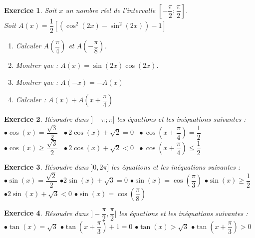 \documentclass[12pt,a4paper]{article}
\newcommand{\s}{\sin}
\newcommand{\cs}{\cos}
\theoremstyle{mystyle}
\newtheorem{exo}{Exercice}
\begin{document}
\begin{multicols*}{2}
\begin{exo}
Soit $x$ un nombre réel de l'intervalle $\left[-\dfrac{\pi}{2};\dfrac{\pi}{2}\right]$.\\
Soit $A(x) = \dfrac{1}{2}\left[(\cs^2(2x) - \s^2(2x)) - 1\right]$
\begin{enumerate}
	\item Calculer $A\left(\dfrac{\pi}{4}\right)$ et $A\left(-\dfrac{\pi}{8}\right)$.
	\item Montrer que : $A(x) = \s(2x)\cs(2x)$.
	\item Montrer que : $A(-x) = -A(x)$
	\item Calculer : $A(x) + A\left(x + \dfrac{\pi}{4}\right)$
\end{enumerate}
\end{exo}

\begin{exo}
Résoudre dans $]-\pi;\pi]$ les équations et les inéquations suivantes :\\
$\bullet \cs(x) = \dfrac{\sqrt{3}}{2} \ \ \ \bullet 2\cs(x) + \sqrt{2} = 0 \ \ \ \bullet\cs\left(x + \dfrac{\pi}{4}\right) = \dfrac{1}{2}$\\
$\bullet \cs(x) \geq \dfrac{\sqrt{3}}{2} \ \ \ \bullet 2\cs(x) + \sqrt{2} < 0 \ \ \ \bullet\cs\left(x + \dfrac{\pi}{4}\right) \leq \dfrac{1}{2}$
\end{exo}

\begin{exo}
Résoudre dans $]0,2\pi]$ les équations et les inéquations suivantes :\\
     $\bullet\sin(x) = \dfrac{\sqrt{2}}{2}$
     $\bullet2\sin(x) + \sqrt{3} = 0$
     $\bullet\sin(x) = \cos\left(\dfrac{\pi}{3}\right)$
     $\bullet\sin(x) \geq \dfrac{1}{2}$
     $\bullet2\sin(x) + \sqrt{3} < 0$
     $\bullet\sin(x) = \cos\left(\dfrac{\pi}{8}\right)$
\end{exo}

\begin{exo}
Résoudre dans $]-\dfrac{\pi}{2}, \dfrac{\pi}{2}[$ les équations et les inéquations suivantes :\\
     $\bullet\tan(x) = \sqrt{3}$
     $\bullet\tan\left(x + \dfrac{\pi}{3}\right) + 1 = 0$
     $\bullet\tan(x) > \sqrt{3}$
     $\bullet\tan\left(x + \dfrac{\pi}{3}\right) > 0$
\end{exo}


\end{multicols*}
\end{document}
